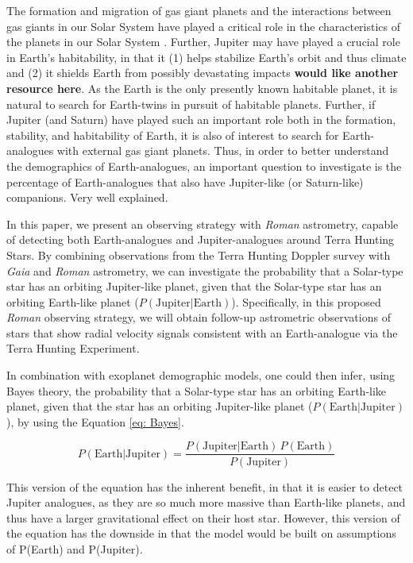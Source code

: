 \documentclass[twocolumn]{aastex631}
\newcommand{\racomment}[1]{{\color{blue}#1}}
\begin{document}
The formation and migration of gas giant planets and the interactions between gas giants in our Solar System have played a critical role in the characteristics of the planets in our Solar System \citep{Tsiganis2005, Morbidelli2005, Gomes2005, Walsh2011, Batygin2015}. Further, Jupiter may have played a crucial role in Earth's habitability, in that it (1) helps stabilize Earth's orbit and thus climate and (2) it shields Earth from possibly devastating impacts \citep{Raymond2004} \textbf{would like another resource here}. As the Earth is the only presently known habitable planet, it is natural to search for Earth-twins in pursuit of habitable planets. Further, if Jupiter (and Saturn) have played such an important role both in the formation, stability, and habitability of Earth, it is also of interest to search for Earth-analogues with external gas giant planets. Thus, in order to better understand the demographics of Earth-analogues, an important question to investigate is the percentage of Earth-analogues that also have Jupiter-like (or Saturn-like) companions.
\racomment{Very well explained.}

In this paper, we present an observing strategy with \textit{Roman} astrometry, capable of detecting both Earth-analogues and Jupiter-analogues around Terra Hunting Stars. By combining observations from the Terra Hunting Doppler survey with \textit{Gaia} and \textit{Roman} astrometry, we can investigate the probability that a \racomment{S}olar-type star has an orbiting Jupiter-like planet, given that the \racomment{S}olar-type star has an orbiting Earth-like planet ($P(\textrm{Jupiter} | \textrm{Earth})$). Specifically, in this proposed \textit{Roman} observing strategy, we will obtain follow-up astrometric observations of stars that show radial velocity signals consistent with an Earth-analogue via the Terra Hunting Experiment. 

In combination with exoplanet demographic models, one could then infer, using Bayes theory, the probability that a Solar-type star has an orbiting Earth-like planet, given that the star has an orbiting Jupiter-like planet ($P(\textrm{Earth} | \textrm{Jupiter})$), by using the Equation \ref{eq: Bayes}.

\begin{equation} \label{eq: Bayes}
    P(\textrm{Earth} | \textrm{Jupiter}) = \frac{P(\textrm{Jupiter} | \textrm{Earth}) \, P(\textrm{Earth})} {P(\textrm{Jupiter})}
\end{equation}

This version of the equation has the inherent benefit, in that it is easier to detect Jupiter analogues, as they are so much more massive than Earth-like planets, and thus have a larger gravitational effect on their host star. However, this version of the equation has the downside in that the model would be built on assumptions of P(Earth) and P(Jupiter).
\end{document}
